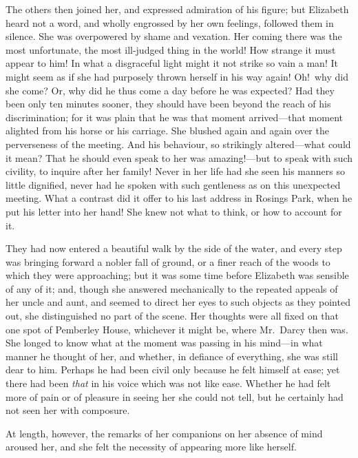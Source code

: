 \documentclass[12pt,english,oneside]{book}
\begin{document}
The others then joined her, and expressed admiration of his figure;
but Elizabeth heard not a word, and wholly engrossed by her own feelings,
followed them in silence. She was overpowered by shame and vexation.
Her coming there was the most unfortunate, the most ill-judged thing
in the world! How strange it must appear to him! In what a disgraceful
light might it not strike so vain a man! It might seem as if she had
purposely thrown herself in his way again! Oh!\ why did she come?
Or, why did he thus come a day before he was expected? Had they been
only ten minutes sooner, they should have been beyond the reach of
his discrimination; for it was plain that he was that moment arrived\mbox{--}--that
moment alighted from his horse or his carriage. She blushed again
and again over the perverseness of the meeting. And his behaviour,
so strikingly altered\mbox{---}what could it mean? That he should
even speak to her was amazing!\mbox{---}but to speak with such civility,
to inquire after her family! Never in her life had she seen his manners
so little dignified, never had he spoken with such gentleness as on
this unexpected meeting. What a contrast did it offer to his last
address in Rosings Park, when he put his letter into her hand! She
knew not what to think, or how to account for it.

They had now entered a beautiful walk by the side of the water, and
every step was bringing forward a nobler fall of ground, or a finer
reach of the woods to which they were approaching; but it was some
time before Elizabeth was sensible of any of it; and, though she answered
mechanically to the repeated appeals of her uncle and aunt, and seemed
to direct her eyes to such objects as they pointed out, she distinguished
no part of the scene. Her thoughts were all fixed on that one spot
of Pemberley House, whichever it might be, where Mr.\ Darcy then
was. She longed to know what at the moment was passing in his mind\mbox{---}in
what manner he thought of her, and whether, in defiance of everything,
she was still dear to him. Perhaps he had been civil only because
he felt himself at ease; yet there had been \textit{that} in his voice
which was not like ease. Whether he had felt more of pain or of pleasure
in seeing her she could not tell, but he certainly had not seen her
with composure.

At length, however, the remarks of her companions on her absence of
mind aroused her, and she felt the necessity of appearing more like
herself.
\end{document}
